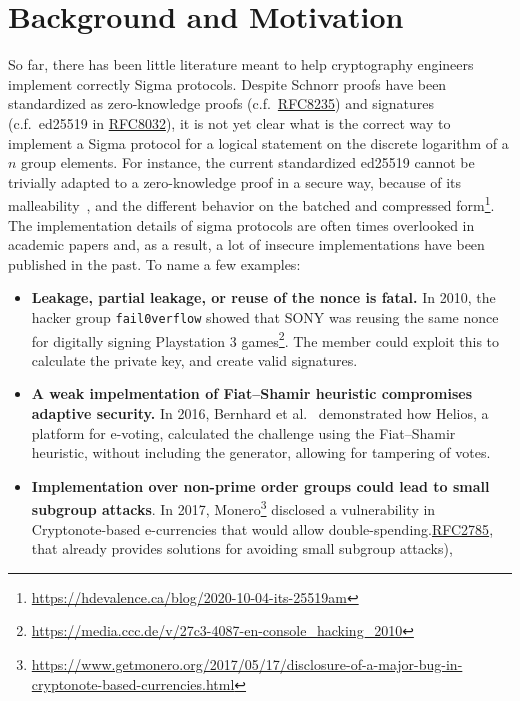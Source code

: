 \documentclass[runningheads]{llncs}
\begin{document}
\section{Background and Motivation}
So far, there has been little literature meant to help cryptography engineers implement correctly Sigma protocols.
Despite Schnorr proofs have been standardized as zero-knowledge proofs (c.f.\ \href{https://tools.ietf.org/html/rfc8235}{RFC8235}) and signatures (c.f.\ ed25519 in \href{https://tools.ietf.org/html/rfc8032}{RFC8032}),
 it is not yet clear what is the correct way to implement a Sigma protocol for a logical statement on the discrete logarithm of a $n$ group elements.
 For instance, the current standardized ed25519 cannot be trivially adapted to a zero-knowledge proof in a secure way, because of its malleability~\cite[p. 7]{JCEng:BDLSY1},  and the different behavior on the batched and compressed form\footnote{\url{https://hdevalence.ca/blog/2020-10-04-its-25519am}}.
The implementation details of sigma protocols are often times overlooked in academic papers and, as a result, a lot of insecure implementations have been published in the past. To name a few examples:
\begin{itemize}
\item \textbf{Leakage, partial leakage, or reuse of the nonce is fatal.}
In 2010, the hacker group \texttt{fail0verflow} showed that SONY was reusing the same nonce for digitally signing Playstation 3 games\footnote{\url{https://media.ccc.de/v/27c3-4087-en-console_hacking_2010}}. The member could exploit this to calculate the private key, and create valid signatures.
\item \textbf{A weak impelmentation of Fiat--Shamir heuristic compromises adaptive security.} In 2016, Bernhard et al.~\cite{??} demonstrated how Helios, a platform for e-voting, calculated the challenge using the Fiat--Shamir heuristic, without including the generator, allowing for tampering of votes.

\item \textbf{Implementation over non-prime order groups could lead to small subgroup attacks}. In 2017, Monero\footnote{\url{https://www.getmonero.org/2017/05/17/disclosure-of-a-major-bug-in-cryptonote-based-currencies.html}} disclosed a vulnerability in Cryptonote-based e-currencies that would allow double-spending.\href{https://tools.ietf.org/html/rfc2785#ref-LAW}{RFC2785}, that already provides solutions for avoiding small subgroup attacks),
\end{itemize}
\end{document}
